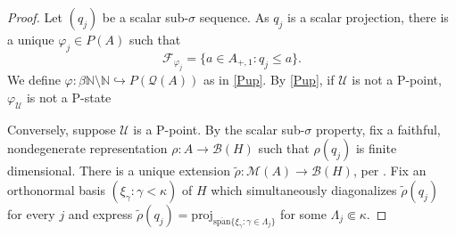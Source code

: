 \documentclass[10pt]{amsart}
\theoremstyle{definition}
\newcommand{\U}{\mathscr{U}}
\begin{document}
\begin{proof}
    Let $(q_j)$ be a scalar sub-$\sigma$ sequence. As $q_j$ is a scalar projection, there is a unique $\varphi_j\in P(A)$ such that 
    \[\mathscr{F}_{\varphi_j}=\{a\in A_{+,1}:q_j\leq a\}.\]
    We define $\varphi:\beta\mathbb{N}\setminus\mathbb{N}\hookrightarrow P(\mathscr{Q}(A))$ as in \ref{Pup}. By \ref{Pup}, if $\U$ is not a P-point, $\varphi_\U$ is not a P-state

    Conversely, suppose $\mathscr{U}$ is a P-point. By the scalar sub-$\sigma$ property, fix a faithful, nondegenerate representation $\rho:A\rightarrow\mathscr{B}(H)$ such that $\rho(q_j)$ is finite dimensional. There is a unique extension $\tilde{\rho}:\mathscr{M}(A)\rightarrow\mathscr{B}(H)$, per \cite[13.2.1]{FA19}. Fix an orthonormal basis $(\xi_\gamma:\gamma<\kappa)$ of $H$ which simultaneously diagonalizes $\tilde{\rho}(q_j)$ for every $j$ and express
    $\tilde{\rho}(q_j)=\text{proj}_{\overline{\text{span}}\{\xi_\gamma:\gamma\in\Lambda_j\}}$ for some $\Lambda_j\Subset\kappa$.


\end{proof}
\end{document}
